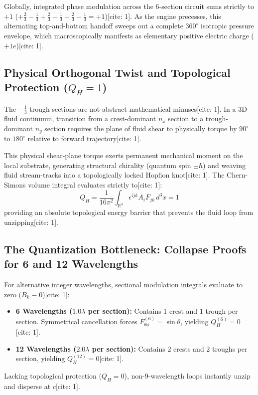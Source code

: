 \documentclass[11pt,a4paper]{article}
\begin{document}
	Globally, integrated phase modulation across the 6-section circuit sums strictly to $+1$ ($+\frac{2}{3} - \frac{1}{3} + \frac{2}{3} - \frac{1}{3} + \frac{2}{3} - \frac{1}{3} = +1$)[cite: 1]. As the engine precesses, this alternating top-and-bottom handoff sweeps out a complete $360^\circ$ isotropic pressure envelope, which macroscopically manifests as elementary positive electric charge ($+1e$)[cite: 1].
	
	\subsection{\texorpdfstring{Physical Orthogonal Twist and Topological Protection ($Q_H = 1$)}{Physical Orthogonal Twist and Topological Protection (Q\_H = 1)}}
	The $-\frac{1}{3}$ trough sections are not abstract mathematical minuses[cite: 1]. In a 3D fluid continuum, transition from a crest-dominant $n_x$ section to a trough-dominant $n_y$ section requires the plane of fluid shear to physically torque by $90^\circ$ to $180^\circ$ relative to forward trajectory[cite: 1].
	
	This physical shear-plane torque exerts permanent mechanical moment on the local substrate, generating structural chirality (quantum spin $\pm\hbar$) and weaving fluid stream-tracks into a topologically locked Hopfion knot[cite: 1]. The Chern-Simons volume integral evaluates strictly to[cite: 1]:
	\begin{equation}
		Q_H = \frac{1}{16\pi^2} \int_{\mathbb{R}^3} \epsilon^{ijk} A_i F_{jk} \, d^3x = 1
	\end{equation}
	providing an absolute topological energy barrier that prevents the fluid loop from unzipping[cite: 1].
	
	\subsection{The Quantization Bottleneck: Collapse Proofs for 6 and 12 Wavelengths}
	For alternative integer wavelengths, sectional modulation integrals evaluate to zero ($B_k \equiv 0$)[cite: 1]:
	\begin{itemize}
		\item \textbf{6 Wavelengths ($1.0\lambda$ per section):} Contains 1 crest and 1 trough per section. Symmetrical cancellation forces $F_{\theta\phi}^{(6)} = \sin\theta$, yielding $Q_H^{(6)} = 0$[cite: 1].
		\item \textbf{12 Wavelengths ($2.0\lambda$ per section):} Contains 2 crests and 2 troughs per section, yielding $Q_H^{(12)} = 0$[cite: 1].
	\end{itemize}
	Lacking topological protection ($Q_H = 0$), non-9-wavelength loops instantly unzip and disperse at $c$[cite: 1].
	
\end{document}
